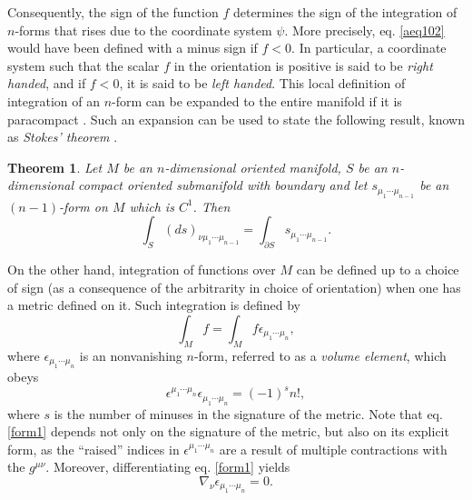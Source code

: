 \documentclass[
12pt,		%
openright,	%
twoside,  %
a4paper,			%
chapter=TITLE,		%
english,			%
french,				%
spanish,			%
brazil				%
]{USPSC-classe/USPSC}
\newtheorem{theorem}{Theorem}[section]
\begin{document}
\begin{apendicesenv}
Consequently, the sign of the function $f$ determines the sign of the integration of $n$-forms that rises due to the coordinate system $\psi$. More precisely, eq. \ref{aeq102} would have been defined with a minus sign if $f<0$. In particular, a coordinate system such that the scalar $f$ in the orientation is positive is said to be \textit{right handed}, and if $f<0$, it is said to be \textit{left handed}. This local definition of integration of an $n$-form can be expanded to the entire manifold if it is paracompact \cite{Wald1984}. Such an expansion can be used to state the following result, known as \textit{Stokes' theorem} \cite{Darling1994}.
\begin{theorem}
    Let $M$ be an $n$-dimensional oriented manifold, $S$ be an $n$-dimensional compact oriented submanifold with boundary and let $s_{\mu_1\cdots\mu_{n-1}}$ be an $(n-1)$-form on $M$ which is $C^1$. Then
    \begin{equation}
        \int_{S}(ds)_{\nu\mu_1\cdots\mu_{n-1}}=\int_{\partial S}s_{\mu_1\cdots\mu_{n-1}}.
    \end{equation}
\end{theorem}

On the other hand, integration of functions over $M$ can be defined up to a choice of sign (as a consequence of the arbitrarity in choice of orientation) when one has a metric defined on it. Such integration is defined by
\begin{equation}\label{aeq1010}
    \int_Mf=\int_Mf\epsilon_{\mu_1\cdots\mu_{n}},
\end{equation}
where $\epsilon_{\mu_1\cdots\mu_{n}}$ is an nonvanishing $n$-form, referred to as a \textit{volume element}, which obeys
\begin{equation}\label{form1}
    \epsilon^{\mu_1\cdots\mu_{n}}\epsilon_{\mu_1\cdots\mu_{n}}=(-1)^s n!,
\end{equation}
where $s$ is the number of minuses in the signature of the metric. Note that eq. \ref{form1} depends not only on the signature of the metric, but also on its explicit form, as the “raised” indices in $\epsilon^{\mu_1\cdots\mu_{n}}$ are a result of multiple contractions with the $g^{\mu\nu}$. Moreover, differentiating eq. \ref{form1} yields
\begin{equation}\label{54}
    \nabla_{\nu}\epsilon_{\mu_1\cdots\mu_{n}}=0.
\end{equation}


\end{apendicesenv}
\end{document}
